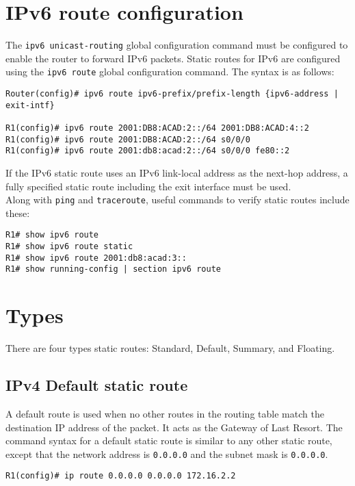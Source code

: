 \section{IPv6 route configuration}

The \verb|ipv6 unicast-routing| global configuration command must be configured to enable the router to forward IPv6 packets. Static routes for IPv6 are configured using the \verb|ipv6 route| global configuration command. The syntax is as follows:

\begin{verbatim}
Router(config)# ipv6 route ipv6-prefix/prefix-length {ipv6-address | exit-intf}

R1(config)# ipv6 route 2001:DB8:ACAD:2::/64 2001:DB8:ACAD:4::2
R1(config)# ipv6 route 2001:DB8:ACAD:2::/64 s0/0/0
R1(config)# ipv6 route 2001:db8:acad:2::/64 s0/0/0 fe80::2
\end{verbatim}

\note  If the IPv6 static route uses an IPv6 link-local address as the next-hop address, a fully specified static route including the exit interface must be used.\\

Along with \verb|ping| and \verb|traceroute|, useful commands to verify static routes include these:

\begin{verbatim}
R1# show ipv6 route
R1# show ipv6 route static
R1# show ipv6 route 2001:db8:acad:3::
R1# show running-config | section ipv6 route
\end{verbatim}

\section{Types}

There are four types static routes: Standard, Default, Summary, and Floating.

\subsection{IPv4 Default static route}  

A default route is used when no other routes in the routing table match the destination IP address of the packet. It acts as the Gateway of Last Resort. The command syntax for a default static route is similar to any other static route, except that the network address is \verb|0.0.0.0| and the subnet mask is \verb|0.0.0.0|.

\begin{verbatim}
R1(config)# ip route 0.0.0.0 0.0.0.0 172.16.2.2
\end{verbatim}

